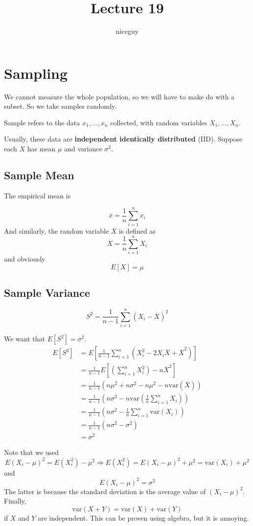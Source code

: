 \documentclass[12pt]{article}
\author{niceguy}
\title{Lecture 19}
\begin{document}
\maketitle

\section{Sampling}
We cannot measure the whole population, so we will have to make do with a subset. So we take samples randomly.

\begin{defn}
	Sample refers to the data $x_1,\dots,x_n$ collected, with random variables $X_1,\dots,X_n$.
\end{defn}

Usually, these data are \textbf{independent identically distributed} (IID). Suppose each $X$ has mean $\mu$ and variance $\sigma^2$.

\subsection{Sample Mean}

The empirical mean is

$$\overline{x} = \frac{1}{n} \sum_{i=1}^n x_i$$
And similarly, the random variable $\overline{X}$ is defined as
$$\overline{X} = \frac{1}{n} \sum_{i=1}^n X_i$$
and obviously
$$E[X] = \mu$$

\subsection{Sample Variance}

$$S^2 = \frac{1}{n-1} \sum_{i=1}^n (X_i - \overline{X})^2$$

We want that $E[S^2] = \sigma^2$.
\begin{align*}
	E[S^2] &= E\left[\frac{1}{n-1} \sum_{i=1}^n \left(X_i^2 - 2X_i\overline{X} + \overline{X}^2\right)\right] \\
           &= \frac{1}{n-1} E\left[\left(\sum_{i=1}^n X_i^2\right) - n\overline{X}^2\right] \\
	       &= \frac{1}{n-1}\left(n\mu^2 + n\sigma^2 - n\mu^2 - n\text{var}(\overline{X})\right) \\
	       &= \frac{1}{n-1}\left(n\sigma^2 - n\text{var}\left(\frac{1}{n}\sum_{i=1}^n X_i\right)\right) \\
	       &= \frac{1}{n-1} \left(n\sigma^2 - \frac{1}{n}\sum_{i=1}^n\text{var}(X_i)\right) \\
	       &= \frac{1}{n-1} (n\sigma^2 - \sigma^2) \\
	       &= \sigma^2
\end{align*}

Note that we used
$$E(X_i - \mu)^2 = E(X_i^2) - \mu^2 \Rightarrow E(X_i^2) = E(X_i - \mu)^2 + \mu^2 = \text{var}(X_i) + \mu^2$$
and
$$E(X_i - \mu)^2 = \sigma^2$$
The latter is because the standard deviation is the average value of $(X_i - \mu)^2$. Finally,
$$\text{var}(X+Y) = \text{var}(X) + \text{var}(Y)$$
if $X$ and $Y$ are independent. This can be proven using algebra, but it is annoying.
\end{document}
